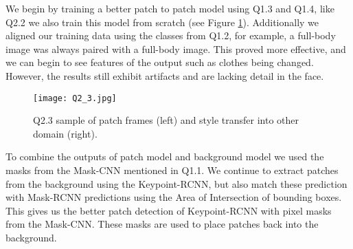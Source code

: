  We begin by training a better patch to patch model using Q1.3 and Q1.4, like Q2.2 we also train this model from scratch (see Figure \ref{fig:Q2_4}).
 Additionally we aligned our training data using the classes from Q1.2, for example, a full-body image was always paired with a full-body image.
 This proved more effective, and we can begin to see features of the output such as clothes being changed.
 However, the results still exhibit artifacts and are lacking detail in the face. 
 
 \begin{figure}[h!]
  \begin{center}
  \texttt{[image: Q2\_3.jpg]}
    \caption{Q2.3 sample of patch frames (left) and style transfer into other domain (right).}
    \label{fig:Q2_4}
  \end{center}
  \end{figure}
 
 To combine the outputs of patch model and background model we used the masks from the Mask-CNN mentioned in Q1.1.
 We continue to extract patches from the background using the Keypoint-RCNN, but also match these prediction with Mask-RCNN predictions using the Area of Intersection of bounding boxes.
 This gives us the better patch detection of Keypoint-RCNN with pixel masks from the Mask-CNN.
 These masks are used to place patches back into the background.
 